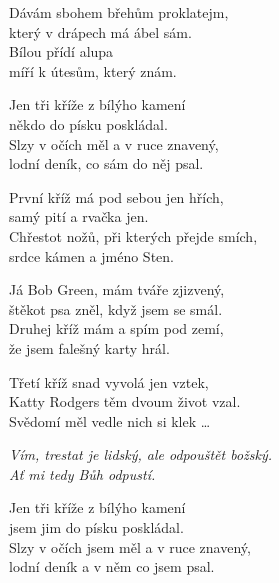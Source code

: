 
\ve{}
Dávám sbohem břehům proklatejm,\\
který v drápech má ábel sám.\\
Bílou přídí alupa \\
míří k útesům, který znám.

\cho{}
Jen tři kříže z bílýho kamení\\
někdo do písku poskládal.\\
Slzy v očích měl a v ruce znavený,\\
lodní deník, co sám do něj psal.

\ve{}
První kříž má pod sebou jen hřích,\\
samý pití a rvačka jen.\\
Chřestot nožů, při kterých přejde smích,\\
srdce kámen a jméno Sten.

\cho{}

\ve{}
Já Bob Green, mám tváře zjizvený,\\
štěkot psa zněl, když jsem se smál.\\
Druhej kříž mám a spím pod zemí,\\
že jsem falešný karty hrál.

\cho{}

\ve{}
Třetí kříž snad vyvolá jen vztek,\\
Katty Rodgers těm dvoum život vzal.\\
Svědomí měl vedle nich si klek \ldots

\textit{Vím, trestat je lidský, ale odpouštět božský.\\
Ať mi tedy Bůh odpustí.}

\cho{}Jen tři kříže z bílýho kamení\\
jsem jim do písku poskládal.\\
Slzy v očích jsem měl a v ruce znavený,\\
lodní deník a v něm co jsem psal. 

\esong